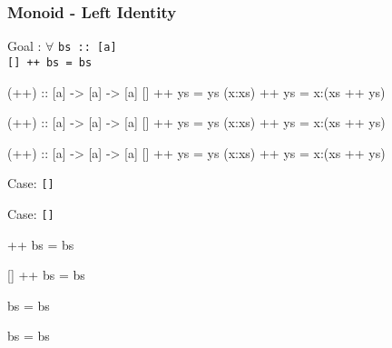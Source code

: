 \documentclass{beamer}
\newcommand{\ca}[1]{{\color{blue}#1}}
\newcommand{\cb}[1]{{\color{violet}#1}}
\newcommand{\ce}[1]{{\color{green!50!black}#1}}
\begin{document}
\begin{frame}[t,fragile]
    \frametitle {Monoid - Left Identity}

\begingroup
\color{gray}\fontsize{10}{9.8}\selectfont

Goal : $\forall$ \verb?bs :: [a]? \\
    \quad \alert<2>{\Verb?[] ++ bs = bs?}

\vspace{10pt}

\begin{overprint}

\begin{semiverbatim}
(++) :: [a] -> [a] -> [a]
[]     ++ ys = ys
(x:xs) ++ ys = x:(xs ++ ys)
\end{semiverbatim}

\begin{semiverbatim}
(++) :: [a] -> [a] -> [a]
\ca{[]}     ++ \cb{ys} = ys
(x:xs) ++ ys = x:(xs ++ ys)
\end{semiverbatim}

\begin{semiverbatim}
(++) :: [a] -> [a] -> [a]
\ca{[]}     ++ \cb{ys} = \cb{ys}
(x:xs) ++ ys = x:(xs ++ ys)
\end{semiverbatim}

\end{overprint}

\endgroup

\vspace{10pt}

\begin{overprint}

Case: \ce{\Verb?[]?}

Case: \ce{\Verb?[]?} \checkmark

\end{overprint}

\vspace{5pt}

\begin{center}
\begin{overprint}

\begin{semiverbatim}
[] ++ bs = bs
\end{semiverbatim}

\begin{semiverbatim}
\ca{[]} ++ \cb{bs} = bs
\end{semiverbatim}

\begin{semiverbatim}
      \cb{bs} = bs
\end{semiverbatim}

\begin{semiverbatim}
      \alert<8>{bs} = \alert<8>{bs}
\end{semiverbatim}

\end{overprint}
\end{center}

\end{frame}
\end{document}
